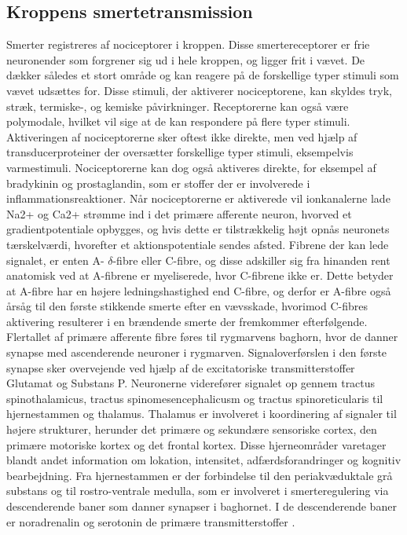 \subsection{Kroppens smertetransmission}
Smerter registreres af nociceptorer i kroppen. Disse smertereceptorer er frie neuronender som forgrener sig ud i hele kroppen, og ligger frit i vævet. De dækker således et stort område og kan reagere på de forskellige typer stimuli som vævet udsættes for. Disse stimuli, der aktiverer nociceptorene, kan skyldes tryk, stræk, termiske-, og kemiske påvirkninger. Receptorerne kan også være polymodale, hvilket vil sige at de kan respondere på flere typer stimuli. Aktiveringen af nociceptorerne sker oftest ikke direkte, men ved hjælp af transducerproteiner der oversætter forskellige typer stimuli, eksempelvis varmestimuli. Nociceptorerne kan dog også aktiveres direkte, for eksempel af bradykinin og prostaglandin, som er stoffer der er involverede i inflammationsreaktioner. Når nociceptorerne er aktiverede vil ionkanalerne lade Na2+ og Ca2+ strømme ind i det primære afferente neuron, hvorved et gradientpotentiale opbygges, og hvis dette er tilstrækkelig højt opnås neuronets tærskelværdi, hvorefter et aktionspotentiale sendes afsted. Fibrene der kan lede signalet, er enten A- $\delta$-fibre eller C-fibre, og disse adskiller sig fra hinanden rent anatomisk ved at A-fibrene er myeliserede, hvor C-fibrene ikke er. Dette betyder at A-fibre har en højere ledningshastighed end C-fibre, og derfor er A-fibre også årsåg til den første stikkende smerte efter en vævsskade, hvorimod C-fibres aktivering resulterer i en brændende smerte der fremkommer efterfølgende. \citep{smerter} 
Flertallet af primære afferente fibre føres til rygmarvens baghorn, hvor de danner synapse med ascenderende neuroner i rygmarven. Signaloverførslen i den første synapse sker overvejende ved hjælp af de excitatoriske transmitterstoffer Glutamat og Substans P. 
Neuronerne viderefører signalet op gennem tractus spinothalamicus, tractus spinomesencephalicusm og tractus spinoreticularis til hjernestammen og thalamus. Thalamus er involveret i koordinering af signaler til højere strukturer, herunder det primære og sekundære sensoriske cortex, den primære motoriske kortex og det frontal kortex. Disse hjerneområder varetager blandt andet information om lokation, intensitet, adfærdsforandringer og  kognitiv bearbejdning. 
Fra hjernestammen er der forbindelse til den periakvæduktale grå substans og til rostro-ventrale medulla, som er involveret i smerteregulering via descenderende baner som danner synapser i baghornet. I de descenderende baner er noradrenalin og serotonin de primære transmitterstoffer . \citep{smerter}

